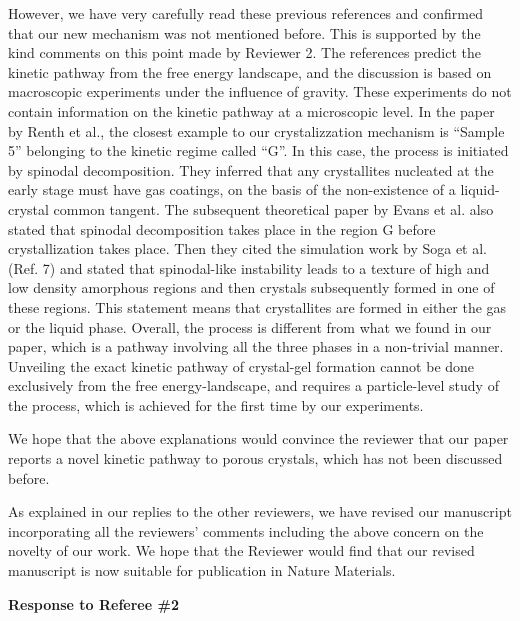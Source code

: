\documentclass[11pt]{article}
\begin{document}
However, we have very carefully read these previous references and confirmed that our new mechanism was not mentioned before. This is supported by the kind comments on this point made by Reviewer 2. The references predict the kinetic pathway from the free energy landscape, and the discussion
is based on macroscopic experiments under the influence of gravity. These experiments do not contain information on the kinetic pathway at a microscopic level.
In the paper by Renth et al., the closest example to our crystalizzation mechanism is “Sample 5” belonging to the kinetic regime called “G”. In this case, the process is initiated by spinodal decomposition. They inferred that any crystallites nucleated at the early stage must have gas coatings, on the basis of the non-existence of a liquid-crystal common tangent. The subsequent theoretical paper by Evans et al. also stated that spinodal decomposition takes place in the region G before crystallization takes place. Then they cited the simulation work by Soga et al. (Ref. 7) and 
stated that spinodal-like instability leads to a texture of high and low density amorphous regions and then crystals subsequently formed in one of these regions. This statement means that crystallites are formed in either the gas or the liquid phase. Overall, the process is different from what we found in our paper, which is a pathway involving all the three phases in a non-trivial manner. Unveiling the exact kinetic pathway of crystal-gel formation cannot
be done exclusively from the free energy-landscape, and requires a particle-level study of the process, which is achieved for the first time by our experiments.

We hope that the above explanations would convince the reviewer that our paper reports a novel kinetic pathway to porous crystals, which has not been discussed before. 

As explained in our replies to the other reviewers, we have revised our manuscript incorporating all the reviewers’ comments including the above concern on the novelty of our work. We hope that the Reviewer would find that our revised manuscript is now suitable for publication in Nature Materials. 


\clearpage

\noindent
\begin{Large}
{\bf Response to Referee \#2}
\end{Large}


\vspace{1em}

\singlespacing
\end{document}
